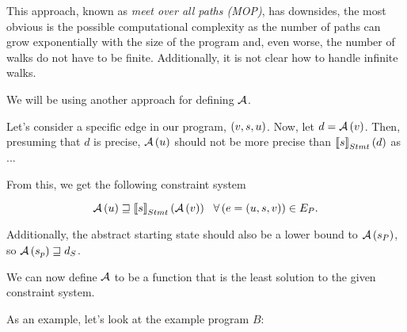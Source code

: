 \documentclass[..thesis.tex]{subfiles}
\begin{document}
This approach, known as \textit{meet over all  paths (MOP)}, has downsides, the most obvious is the possible computational complexity as the number of paths can grow exponentially with the size of the program and, even worse, the number of walks do not have to be finite. Additionally, it is not clear how to handle infinite walks. 

We will be using another approach for defining $\mathcal{A}$.


Let's consider a specific edge in our program, $\left( v, s, u \right)$. Now, let $d = \mathcal{A} \left( v \right)$. Then, presuming that $d$ is precise, $\mathcal{A} \left( u \right) $ should not be more precise than $\left\llbracket s \right\rrbracket_{Stmt} \left( d \right)$ as ...

  
From this, we get the following constraint system

\begin{equation}
\label{constraints}
\mathcal{A} \left(  u \right) \sqsupseteq \left\llbracket s \right\rrbracket_{Stmt} \left( \mathcal{A} \left( v \right) \right) ~~ \forall \left( e = \left( u, s, v \right) \right) \in E_P \text{.}
\end{equation}

Additionally, the abstract starting state should also be a lower bound to $\mathcal{A} \left( s_P \right)$, so $\mathcal{A} \left( s_p \right) \sqsupseteq d_S$. 

We can now define $\mathcal{A}$ to be a function that is the least solution to the given constraint system.


As an example, let's look at the example program $B$: 
\end{document}
